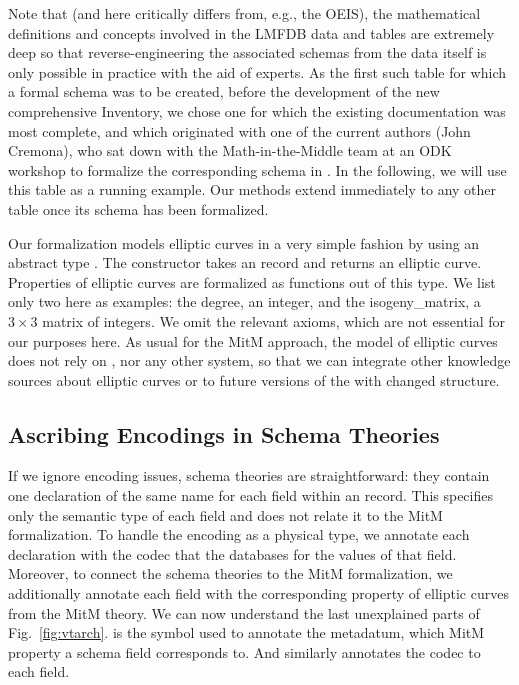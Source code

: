Note that (and here \lmfdb critically differs from, e.g., the OEIS), the mathematical definitions and concepts involved in the LMFDB data and tables are extremely deep so that reverse-engineering the associated schemas from the data itself is only possible in practice with the aid of experts.
As the first such table for which a formal schema was to be created, before the development of the new comprehensive Inventory, we chose one for which the existing documentation was most complete, and which originated with one of the current authors (John Cremona), who sat down with the Math-in-the-Middle team at an ODK workshop to formalize the corresponding schema in \ommt.
In the following, we will use this table as a running example.
Our methods extend immediately to any other table once its schema has been formalized.

Our formalization models elliptic curves in a very simple fashion by using an abstract type . 
The constructor  takes an \mmt record and returns an elliptic curve. 
Properties of elliptic curves are formalized as functions out of this type.
We list only two here as examples: the \textsf{degree}, an integer, and the \textsf{isogeny\_matrix}, a $3 \times 3$ matrix of integers.
We omit the relevant axioms, which are not essential for our purposes here.
As usual for the MitM approach, the model of elliptic curves does not rely on \lmfdb, nor any other system, so that we can integrate other knowledge sources about elliptic curves or to future versions of the \lmfdb with changed structure. 


\subsection{Ascribing Encodings in Schema Theories}\label{sec:vt:codec}

If we ignore encoding issues, schema theories are straightforward: they contain one declaration of the same name for each field within an \lmfdb record. 
This specifies only the semantic type of each field and does not relate it to the MitM formalization.
To handle the encoding as a physical type, we annotate each declaration with the codec that the databases for the values of that field.
Moreover, to connect the schema theories to the MitM formalization, we additionally annotate each field with the corresponding property of elliptic curves from the MitM theory.
We can now understand the last unexplained parts of Fig.~\ref{fig:vtarch}.
 is the symbol used to annotate the metadatum, which MitM property a schema field corresponds to.
And  similarly annotates the codec to each field.

